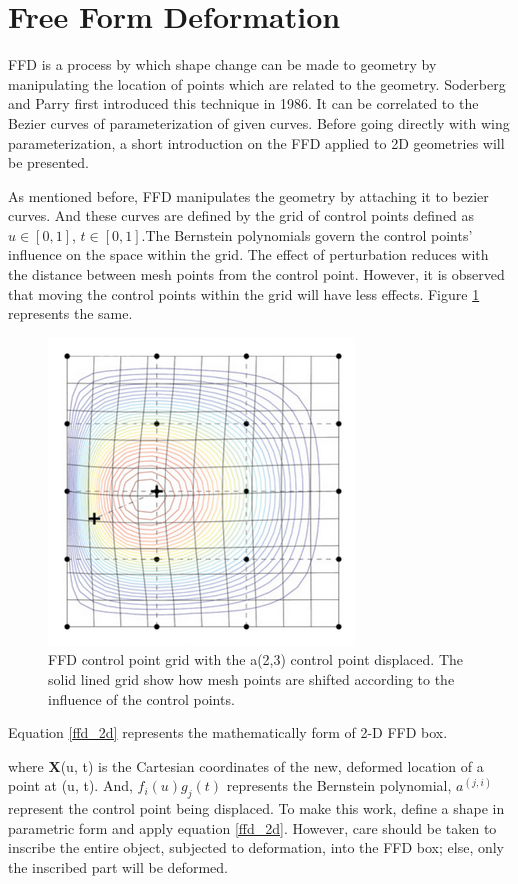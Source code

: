 \section{Free Form Deformation}
FFD is a process by which shape change can be made to geometry by manipulating the location of points which are related to the geometry. Soderberg and Parry first introduced this technique in 1986. It can be correlated to the Bezier curves of parameterization of given curves. Before going directly with wing parameterization, a short introduction on the FFD applied to 2D geometries will be presented.

As mentioned before, FFD manipulates the geometry by attaching it to bezier curves. And these curves are defined by the grid of control points defined as $u \in[0,1]$, $t\in[0,1]$.The Bernstein polynomials govern the control points' influence on the space within the grid. The effect of perturbation reduces with the distance between mesh points from the control point. However, it is observed that moving the control points within the grid will have less effects. Figure \ref{ffd_effect} represents the same.

\begin{figure}
    \centering
    \includegraphics[scale=0.56]{figures/ffd5.png}
    \caption{FFD control point grid with the a(2,3) control point displaced. The solid lined grid show how mesh points are shifted according to the influence of the control points\cite{ffd_book}.}
    \label{ffd_effect}
\end{figure}

Equation \ref{ffd_2d} represents the mathematically form of 2-D FFD box.


where \textbf{X}(u, t) is the Cartesian coordinates of the new, deformed location of a point at (u, t). And, $f_i(u)g_j(t)$ represents the Bernstein polynomial, $a^{(j,i)}$ represent the control point being displaced. To make this work, define a shape in parametric form and apply equation \ref{ffd_2d}. However, care should be taken to inscribe the entire object, subjected to deformation, into the FFD box; else, only the inscribed part will be deformed.

